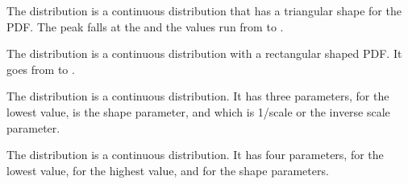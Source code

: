 The  distribution is a continuous distribution
that has a triangular shape for the PDF.  The peak falls at the
 and the values run from  to
.


The  distribution is a continuous distribution with
a rectangular shaped PDF.  It goes from  to
.



The  distribution is a continuous distribution.  It
has three parameters,  for the lowest value,
 is the shape parameter, and  which
is 1/scale or the inverse scale parameter.


The  distribution is a continuous distribution.  It has
four parameters,  for the lowest value,
 for the highest value,  and
 for the shape parameters.
